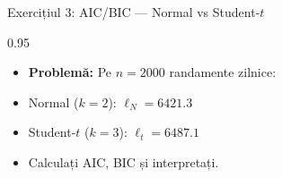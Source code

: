 \documentclass[9pt, aspectratio=169, t]{beamer}
\begin{document}
\begin{frame}{Exercițiul 3: AIC/BIC --- Normal vs Student-$t$}
\begin{cminipage}{0.95\textwidth}
    \begin{itemize}\setlength{\itemsep}{0pt}
        \item \textbf{Problemă:} Pe $n = 2000$ randamente zilnice:
    \end{itemize}
    \begin{itemize}\setlength{\itemsep}{0pt}
        \item Normal ($k=2$): $\ell_N = 6421.3$
        \item Student-$t$ ($k=3$): $\ell_t = 6487.1$
    \end{itemize}
    \begin{itemize}\setlength{\itemsep}{0pt}
        \item Calculați AIC, BIC și interpretați.
    \end{itemize}
\end{cminipage}
\end{frame}
\end{document}
